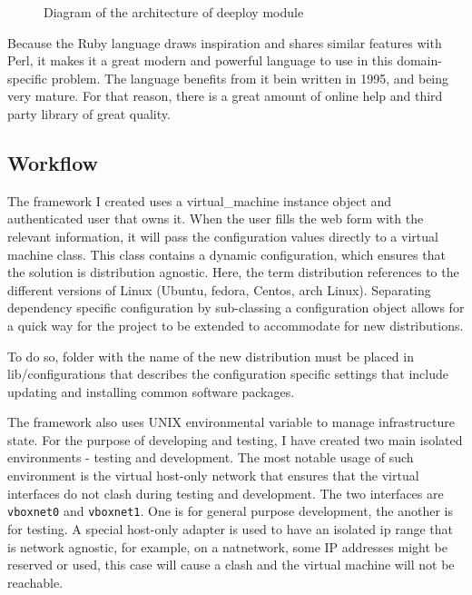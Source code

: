 \documentclass{article}
\begin{document}
\begin{figure}
    \vspace{1cm}
    \centering          
          
    \caption{Diagram of the architecture of deeploy module}
    \label{fig:Test}
    \vspace{3cm}
\end{figure}

%

Because the Ruby language draws inspiration and shares similar features with Perl, it makes it a great modern and powerful language to use in this domain-specific problem. The language benefits from it bein written in 1995, and being very mature. For that reason, there is a great amount of online help and third party library of great quality.

\subsection{Workflow}
The framework I created uses a \gls{virtual_machine} instance object and authenticated user that owns it. When the user fills the web form with the relevant information, it will pass the configuration values directly to a virtual machine class. This class contains a dynamic configuration, which ensures that the solution is distribution agnostic. Here, the term distribution references to the different versions of Linux (Ubuntu, fedora, Centos, arch Linux). Separating dependency specific configuration by sub-classing a configuration object allows for a quick way for the project to be extended to accommodate for new distributions.

To do so, folder with the name of the new distribution must be placed in lib/configurations that describes the configuration specific settings that include updating and installing common software packages.

The framework also uses UNIX environmental variable to manage infrastructure state. For the  purpose of developing and testing, I have created two main isolated environments - testing and development.
The most notable usage of such environment is the virtual host-only network that ensures that the virtual interfaces do not clash during testing and development. The two interfaces are \texttt{vboxnet0} and \texttt{vboxnet1}. One is for general purpose development, the another is for testing. A special host-only adapter is used to have an isolated ip range that is network agnostic, for example, on a \gls{natnetwork}, some IP addresses might be reserved or used, this case will cause a clash and the virtual machine will not be reachable.
\end{document}
